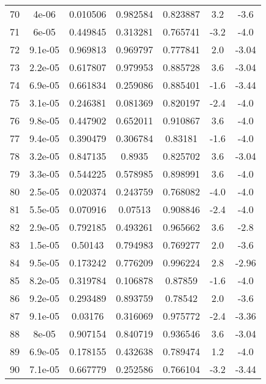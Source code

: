 \begin{table}
\begin{tabular}{c|c|c|c|c|c|c}
70 & 4e-06 & 0.010506 & 0.982584 & 0.823887 & 3.2 & -3.6\\
71 & 6e-05 & 0.449845 & 0.313281 & 0.765741 & -3.2 & -4.0\\
72 & 9.1e-05 & 0.969813 & 0.969797 & 0.777841 & 2.0 & -3.04\\
73 & 2.2e-05 & 0.617807 & 0.979953 & 0.885728 & 3.6 & -3.04\\
74 & 6.9e-05 & 0.661834 & 0.259086 & 0.885401 & -1.6 & -3.44\\
75 & 3.1e-05 & 0.246381 & 0.081369 & 0.820197 & -2.4 & -4.0\\
76 & 9.8e-05 & 0.447902 & 0.652011 & 0.910867 & 3.6 & -4.0\\
77 & 9.4e-05 & 0.390479 & 0.306784 & 0.83181 & -1.6 & -4.0\\
78 & 3.2e-05 & 0.847135 & 0.8935 & 0.825702 & 3.6 & -3.04\\
79 & 3.3e-05 & 0.544225 & 0.578985 & 0.898991 & 3.6 & -4.0\\
80 & 2.5e-05 & 0.020374 & 0.243759 & 0.768082 & -4.0 & -4.0\\
81 & 5.5e-05 & 0.070916 & 0.07513 & 0.908846 & -2.4 & -4.0\\
82 & 2.9e-05 & 0.792185 & 0.493261 & 0.965662 & 3.6 & -2.8\\
83 & 1.5e-05 & 0.50143 & 0.794983 & 0.769277 & 2.0 & -3.6\\
84 & 9.5e-05 & 0.173242 & 0.776209 & 0.996224 & 2.8 & -2.96\\
85 & 8.2e-05 & 0.319784 & 0.106878 & 0.87859 & -1.6 & -4.0\\
86 & 9.2e-05 & 0.293489 & 0.893759 & 0.78542 & 2.0 & -3.6\\
87 & 9.1e-05 & 0.03176 & 0.316069 & 0.975772 & -2.4 & -3.36\\
88 & 8e-05 & 0.907154 & 0.840719 & 0.936546 & 3.6 & -3.04\\
89 & 6.9e-05 & 0.178155 & 0.432638 & 0.789474 & 1.2 & -4.0\\
90 & 7.1e-05 & 0.667779 & 0.252586 & 0.766104 & -3.2 & -3.44\\
\end{tabular}
\end{table}
\newpage
